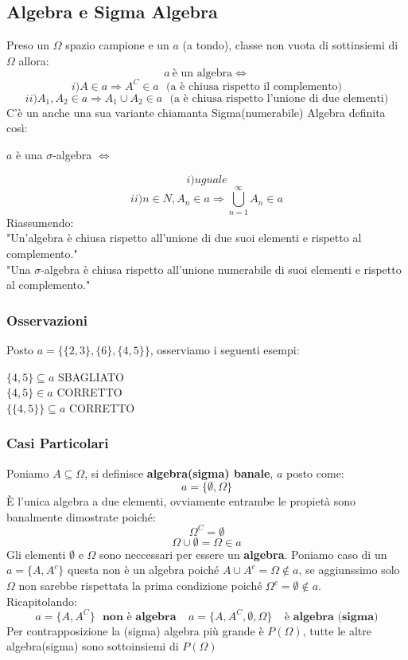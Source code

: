 \subsection{Algebra e Sigma Algebra}
Preso un $\Omega$ spazio campione e un $a$ (a tondo), classe non vuota di sottinsiemi di $\Omega$ allora:
$$ a \: \text{è un algebra} \Leftrightarrow $$
$$ i) A \in a \Rightarrow A^C \in a \:\:\: \text{(a è chiusa rispetto il complemento)} $$
$$ ii) A_1, A_2 \in a \Rightarrow A_1 \cup A_2 \in a \:\:\: \text{(a è chiusa rispetto l'unione di due elementi)} $$
C'è un anche una sua variante chiamanta Sigma(numerabile) Algebra definita così:\\
\begin{center}
$a$ è una $\sigma$-algebra $\Leftrightarrow $
\end{center}
$$ i)uguale $$
$$ ii) n \in N, A_n \in a \Rightarrow \bigcup_{n=1}^{\infty} A_n \in a$$
Riassumendo:\\
"Un'algebra è chiusa rispetto all'unione di due suoi elementi e rispetto al complemento."\\
"Una $\sigma$-algebra è chiusa rispetto all'unione numerabile di suoi elementi e rispetto al complemento."
\subsubsection{Osservazioni}
Posto $a=\{\{2,3\}, \{6\}, \{4,5\}\}$, osserviamo i seguenti esempi:
\begin{center}
$ \{4,5\} \subseteq a $ SBAGLIATO\\
$ \{4,5\} \in a $ CORRETTO\\
$ \{\{4,5\}\} \subseteq a $ CORRETTO
\end{center}

\subsubsection{Casi Particolari}
Poniamo $A \subseteq \Omega$, si definisce \textbf{algebra(sigma) banale}, $a$ posto come:
$$ a = \{\emptyset, \Omega \}$$
È l'unica algebra a due elementi, ovviamente entrambe le propietà sono banalmente dimostrate poiché:
$$ \Omega^C = \emptyset $$
$$ \Omega \cup \emptyset = \Omega \in a $$
Gli elementi $\emptyset$ e $\Omega$ sono neccessari per essere un \textbf{algebra}.
Poniamo caso di un $a=\{A, A^c\}$ questa non è un algebra poiché $A \cup A^c = \Omega \not \in a$, se aggiunssimo solo $\Omega$ non sarebbe rispettata la prima condizione poiché $ \Omega^c = \emptyset \not \in a$.\\
Ricapitolando:
$$ a=\{A, A^C\} \:\:\: \textbf{non è algebra} \:\:\:\:\: a=\{A,A^C,\emptyset,\Omega\} \:\:\:\:\:\textbf{è algebra (sigma)}$$
Per contrapposizione la (sigma) algebra più grande è $P(\Omega)$, tutte le altre algebra(sigma) sono sottoinsiemi di $P(\Omega)$

